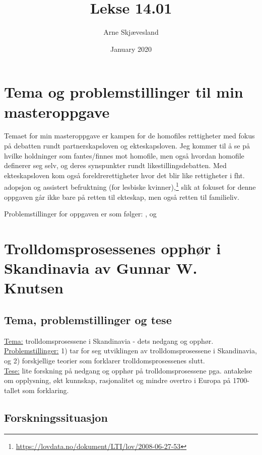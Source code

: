 \documentclass[12pt]{article}
\title{Lekse 14.01}
\author{Arne Skjævesland}
\date{January 2020}
\begin{document}
\maketitle

\section{Tema og problemstillinger til min masteroppgave}
Temaet for min masteroppgave er kampen for de homofiles rettigheter med fokus på debatten rundt partnerskapsloven og 
ekteskapsloven. Jeg kommer til å se på hvilke holdninger som fantes/finnes mot homofile, men også hvordan homofile 
definerer seg selv, og deres synspunkter rundt likestillingsdebatten. Med ekteskapsloven kom også foreldrerettigheter 
hvor det blir like rettigheter i fht. adopsjon og assistert befruktning (for lesbiske  kvinner),\footnote{\url{https://lovdata.no/dokument/LTI/lov/2008-06-27-53}} slik at fokuset for denne oppgaven går ikke bare på retten til ekteskap, men også retten til familieliv.

Problemstillinger for oppgaven er som følger: , og 

\section{Trolldomsprosessenes opphør i Skandinavia av Gunnar W. Knutsen}

\subsection{Tema, problemstillinger og tese}
\underline{Tema:} trolldomsprosessene i Skandinavia - dets nedgang og opphør. \\
\underline{Problemstillinger:} 1) tar for seg utviklingen av trolldomsprosessene i Skandinavia, og 2) forskjellige 
teorier som forklarer trolldomsprosessenes slutt. \\
\underline{Tese:} lite forskning på nedgang og opphør på trolldomsprosessene pga. antakelse om opplysning, økt 
kunnskap, rasjonalitet og mindre overtro i Europa på 1700-tallet som forklaring.

\subsection{Forskningssituasjon}
\end{document}
